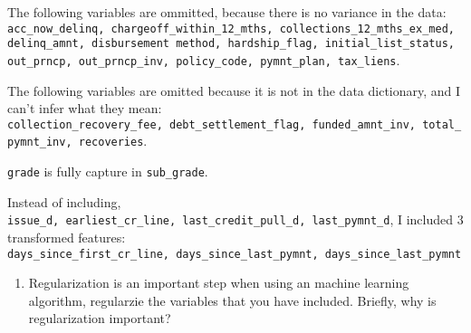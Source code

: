 \documentclass[10pt,notitlepage,onecolumn,aps,pra]{revtex4-1}
\providecommand{\tightlist}{%
      \setlength{\itemsep}{0pt}\setlength{\parskip}{0pt}}
\begin{document}
    The following variables are ommitted, because there is no variance in
the data:
\texttt{acc\_now\_delinq,\ chargeoff\_within\_12\_mths,\ collections\_12\_mths\_ex\_med,\ delinq\_amnt,\ disbursement\ method,\ hardship\_flag,\ initial\_list\_status,\ out\_prncp,\ out\_prncp\_inv,\ policy\_code,\ pymnt\_plan,\ tax\_liens}.

The following variables are omitted because it is not in the data
dictionary, and I can't infer what they mean:
\texttt{collection\_recovery\_fee,\ debt\_settlement\_flag,\ funded\_amnt\_inv,\ total\_pymnt\_inv,\ recoveries}.

\texttt{grade} is fully capture in \texttt{sub\_grade}.

Instead of including,
\texttt{issue\_d,\ earliest\_cr\_line,\ last\_credit\_pull\_d,\ last\_pymnt\_d},
I included 3 transformed features:
\texttt{days\_since\_first\_cr\_line,\ days\_since\_last\_pymnt,\ days\_since\_last\_pymnt}

    \begin{enumerate}
\def\labelenumi{\alph{enumi}.}
\setcounter{enumi}{1}
\tightlist
\item
  Regularization is an important step when using an machine learning
  algorithm, regularzie the variables that you have included. Briefly,
  why is regularization important?
\end{enumerate}
\end{document}
